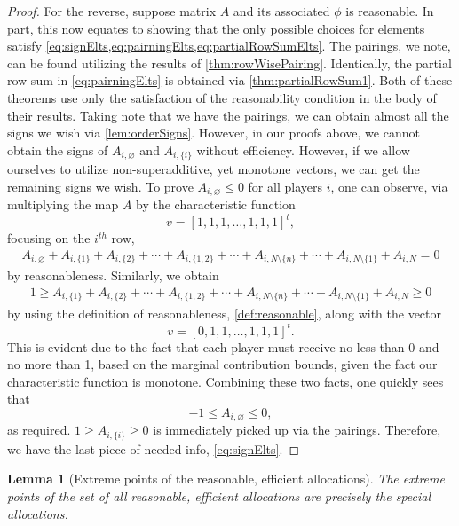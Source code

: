 \documentclass[12pt,letterpaper,final]{article}
\theoremstyle{plain}
\theoremstyle{plain}
\theoremstyle{plain}
\newtheorem{lemma}[theorem]{Lemma}
\theoremstyle{plain}
\theoremstyle{plain}
\theoremstyle{plain}
\theoremstyle{plain}
\theoremstyle{definition}
\theoremstyle{definition}
\theoremstyle{definition}
\theoremstyle{definition}
\theoremstyle{definition}
\theoremstyle{remark}
\theoremstyle{remark}
\theoremstyle{remark}
\theoremstyle{remark}
\begin{document}
\begin{proof}
  For the reverse, suppose matrix \(A\) and its associated
  \(\phi\)  is reasonable. In part, this 
  now equates to showing that the only possible choices for elements
  satisfy \cref{eq:signElts,eq:pairningElts,eq:partialRowSumElts}. The
  pairings, we note, can be found utilizing the results of
  \cref{thm:rowWisePairing}. Identically, the partial row sum in
  \cref{eq:pairningElts} is obtained via
  \cref{thm:partialRowSum1}. Both of these theorems use only the
  satisfaction of the reasonability condition in the body of their
  results. Taking note that we have the pairings, we can obtain almost
  all the signs we wish via \cref{lem:orderSigns}. However, in our
  proofs above, we cannot obtain the signs of \(A_{i,\varnothing}\)
  and \(A_{i,\{i\}}\) without efficiency. However, if we allow
  ourselves to utilize non-superadditive, yet monotone vectors, we
  can get the remaining signs we wish.
  To prove \(A_{i,\varnothing} \leq 0\) for all players \(i\), one can 
  observe, via multiplying the map \(A\) by the characteristic function
  \[v={\left[1,1,1,\ldots,1,1,1\right]}^t,\] focusing on the
  \(i^{th}\) row,  
  \begin{multline*}
    A_{i,\varnothing}+A_{i,\{1\}}+A_{i,\{2\}}+ \cdots 
    + A_{i,\{1,2\}}+\cdots +A_{i,N\setminus\{n\}} +\cdots
    +A_{i,N\setminus\{1\}}+A_{i,N} = 0
  \end{multline*}
  by reasonableness.  Similarly, we obtain
  \begin{multline*}
    1 \geq A_{i,\{1\}}+A_{i,\{2\}}+ \cdots 
    + A_{i,\{1,2\}}+\cdots +A_{i,N\setminus\{n\}} +\cdots 
    +A_{i,N\setminus\{1\}}+A_{i,N} \geq 0
  \end{multline*}
  by using the definition of reasonableness, \cref{def:reasonable}, along with the vector
  \[v={\left[ 0,1,1,\ldots,1,1,1 \right]}^t.\]
  This is evident due to the fact that each player must receive no
  less than 0 and no more than 1, based on the marginal contribution
  bounds, given the fact our characteristic
  function is monotone. Combining these two facts, one quickly sees
  that
  \begin{equation}
    -1 \leq A_{i,\varnothing} \leq 0,
  \end{equation}
  as required. \(1 \geq A_{i,\{i\}}\geq 0\) is immediately picked up
  via the pairings. Therefore, we have the last piece of needed info,
  \cref{eq:signElts}.
\end{proof}

\begin{lemma}[Extreme points of the reasonable, efficient allocations]\label{lem:raavExtremePts}
  The extreme points of the set of all reasonable, efficient
  allocations are precisely the special allocations.
\end{lemma}
\end{document}
